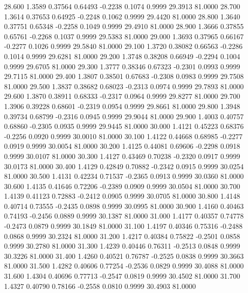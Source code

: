   28.600   1.3589   0.37564   0.64493  -0.2238   0.1074   0.9999  29.3913  81.0000
  28.700   1.3614   0.37653   0.64925  -0.2248   0.1062   0.9999  29.4420  81.0000
  28.800   1.3640   0.37751   0.65348  -0.2258   0.1049   0.9999  29.4910  81.0000
  28.900   1.3666   0.37855   0.65761  -0.2268   0.1037   0.9999  29.5383  81.0000
  29.000   1.3693   0.37965   0.66167  -0.2277   0.1026   0.9999  29.5840  81.0000
  29.100   1.3720   0.38082   0.66563  -0.2286   0.1014   0.9999  29.6281  81.0000
  29.200   1.3748   0.38208   0.66949  -0.2294   0.1004   0.9999  29.6705  81.0000
  29.300   1.3777   0.38346   0.67323  -0.2301   0.0993   0.9999  29.7115  81.0000
  29.400   1.3807   0.38501   0.67683  -0.2308   0.0983   0.9999  29.7508  81.0000
  29.500   1.3837   0.38682   0.68023  -0.2313   0.0974   0.9999  29.7893  81.0000
  29.600   1.3870   0.38911   0.68333  -0.2317   0.0964   0.9999  29.8277  81.0000
  29.700   1.3906   0.39228   0.68601  -0.2319   0.0954   0.9999  29.8661  81.0000
  29.800   1.3948   0.39734   0.68799  -0.2316   0.0945   0.9999  29.9044  81.0000
  29.900   1.4003   0.40757   0.68860  -0.2305   0.0935   0.9999  29.9445  81.0000
  30.000   1.4121   0.45223   0.68376  -0.2256   0.0920   0.9999  30.0010  81.0000
  30.100   1.4122   0.44668   0.68985  -0.2277   0.0919   0.9999  30.0054  81.0000
  30.200   1.4125   0.44081   0.69606  -0.2298   0.0918   0.9999  30.0107  81.0000
  30.300   1.4127   0.43469   0.70238  -0.2320   0.0917   0.9999  30.0173  81.0000
  30.400   1.4129   0.42849   0.70882  -0.2342   0.0915   0.9999  30.0254  81.0000
  30.500   1.4131   0.42234   0.71537  -0.2365   0.0913   0.9999  30.0360  81.0000
  30.600   1.4135   0.41646   0.72206  -0.2389   0.0909   0.9999  30.0504  81.0000
  30.700   1.4139   0.41123   0.72883  -0.2412   0.0905   0.9999  30.0705  81.0000
  30.800   1.4148   0.40714   0.73555  -0.2435   0.0898   0.9999  30.0995  81.0000
  30.900   1.4160   0.40463   0.74193  -0.2456   0.0889   0.9999  30.1387  81.0000
  31.000   1.4177   0.40357   0.74778  -0.2473   0.0879   0.9999  30.1849  81.0000
  31.100   1.4197   0.40346   0.75316  -0.2488   0.0868   0.9999  30.2324  81.0000
  31.200   1.4217   0.40384   0.75822  -0.2501   0.0858   0.9999  30.2780  81.0000
  31.300   1.4239   0.40446   0.76311  -0.2513   0.0848   0.9999  30.3226  81.0000
  31.400   1.4260   0.40521   0.76787  -0.2525   0.0838   0.9999  30.3663  81.0000
  31.500   1.4282   0.40606   0.77254  -0.2536   0.0829   0.9999  30.4088  81.0000
  31.600   1.4304   0.40696   0.77713  -0.2547   0.0819   0.9999  30.4502  81.0000
  31.700   1.4327   0.40790   0.78166  -0.2558   0.0810   0.9999  30.4903  81.0000

